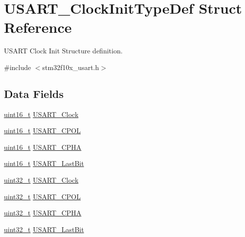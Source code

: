 \hypertarget{struct_u_s_a_r_t___clock_init_type_def}{\section{U\-S\-A\-R\-T\-\_\-\-Clock\-Init\-Type\-Def Struct Reference}
\label{struct_u_s_a_r_t___clock_init_type_def}
}


U\-S\-A\-R\-T Clock Init Structure definition.  




{\ttfamily \#include $<$stm32f10x\-\_\-usart.\-h$>$}

\subsection*{Data Fields}
\begin{DoxyCompactItemize}
\item 
\hyperlink{stdint_8h_a273cf69d639a59973b6019625df33e30}{uint16\-\_\-t} \hyperlink{struct_u_s_a_r_t___clock_init_type_def_a229ba7c3f9a4d6d56513e6899f6c6693}{U\-S\-A\-R\-T\-\_\-\-Clock}
\item 
\hyperlink{stdint_8h_a273cf69d639a59973b6019625df33e30}{uint16\-\_\-t} \hyperlink{struct_u_s_a_r_t___clock_init_type_def_a01450cba8a40cf9a624b25979dc6aa77}{U\-S\-A\-R\-T\-\_\-\-C\-P\-O\-L}
\item 
\hyperlink{stdint_8h_a273cf69d639a59973b6019625df33e30}{uint16\-\_\-t} \hyperlink{struct_u_s_a_r_t___clock_init_type_def_abda3a2172bd5819e1c207dc0d1c822d8}{U\-S\-A\-R\-T\-\_\-\-C\-P\-H\-A}
\item 
\hyperlink{stdint_8h_a273cf69d639a59973b6019625df33e30}{uint16\-\_\-t} \hyperlink{struct_u_s_a_r_t___clock_init_type_def_ab1b28d63d2be6e57849666d78a4467bd}{U\-S\-A\-R\-T\-\_\-\-Last\-Bit}
\item 
\hyperlink{stdint_8h_a435d1572bf3f880d55459d9805097f62}{uint32\-\_\-t} \hyperlink{struct_u_s_a_r_t___clock_init_type_def_afe7a3ea8a61ef7934c43f86ac74581d6}{U\-S\-A\-R\-T\-\_\-\-Clock}
\item 
\hyperlink{stdint_8h_a435d1572bf3f880d55459d9805097f62}{uint32\-\_\-t} \hyperlink{struct_u_s_a_r_t___clock_init_type_def_a640dfb118c99156f34c0769eb8138cfb}{U\-S\-A\-R\-T\-\_\-\-C\-P\-O\-L}
\item 
\hyperlink{stdint_8h_a435d1572bf3f880d55459d9805097f62}{uint32\-\_\-t} \hyperlink{struct_u_s_a_r_t___clock_init_type_def_a167022a48aeaba5515054bbba2929986}{U\-S\-A\-R\-T\-\_\-\-C\-P\-H\-A}
\item 
\hyperlink{stdint_8h_a435d1572bf3f880d55459d9805097f62}{uint32\-\_\-t} \hyperlink{struct_u_s_a_r_t___clock_init_type_def_ae26adb8d7ed03618a8d8f8f9cbf3cba6}{U\-S\-A\-R\-T\-\_\-\-Last\-Bit}
\end{DoxyCompactItemize}


